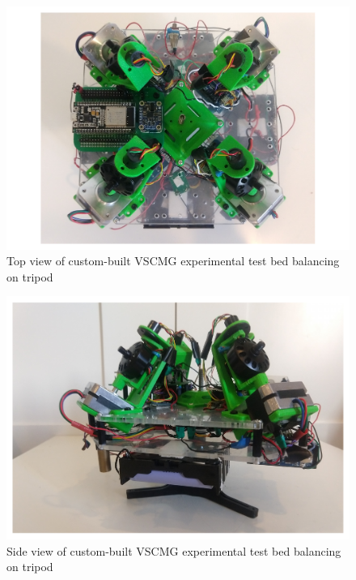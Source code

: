 \begin{figure}
    \centering
    \includegraphics[width=\textwidth]{figures/photos/tv-tb.pdf}
    \caption{Top view of custom-built VSCMG experimental test bed balancing on tripod}
    \label{fig:tv-tb}
\end{figure}

\begin{figure}
    \centering
    \includegraphics[width=\textwidth]{figures/photos/sv-tb.pdf}
    \caption{Side view of custom-built VSCMG experimental test bed balancing on tripod}
    \label{fig:sv-tb}
\end{figure}
